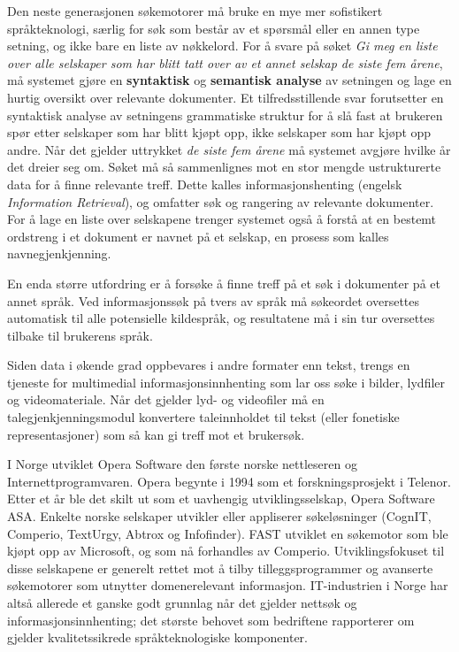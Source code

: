\begin{multicols}{2}

Den neste generasjonen søkemotorer må bruke en mye mer sofistikert språkteknologi, særlig for søk som består av et spørsmål eller en annen type setning, og ikke bare en liste av nøkkelord. For å svare på søket \textit{Gi meg en liste over alle selskaper som har blitt tatt over av et annet selskap de siste fem årene}, må systemet gjøre en \textbf{syntaktisk} og \textbf{semantisk analyse} av setningen og lage en hurtig oversikt over relevante dokumenter. Et tilfredsstillende svar forutsetter en syntaktisk analyse av setningens grammatiske struktur for å slå fast at brukeren spør etter selskaper som har blitt kjøpt opp, ikke selskaper som har kjøpt opp andre. Når det gjelder uttrykket \textit{de siste fem årene} må systemet avgjøre hvilke år det dreier seg om. Søket må så sammenlignes mot en stor mengde ustrukturerte data for å finne relevante treff. Dette kalles informasjonshenting (engelsk \textit{Information Retrieval}), og omfatter søk og rangering av relevante dokumenter. For å lage en liste over selskapene trenger systemet også å forstå at en bestemt ordstreng i et dokument er navnet på et selskap, en prosess som kalles navnegjenkjenning.

En enda større utfordring er å forsøke å finne treff på et søk i dokumenter på et annet språk. Ved informasjonssøk på tvers av språk må søkeordet oversettes automatisk til alle potensielle kildespråk, og resultatene må i sin tur oversettes tilbake til brukerens språk.   

Siden data i økende grad oppbevares i andre formater enn tekst, trengs en tjeneste for multimedial informasjonsinnhenting som lar oss søke i bilder, lydfiler og videomateriale. Når det gjelder lyd- og videofiler må en talegjenkjenningsmodul konvertere taleinnholdet til tekst (eller fonetiske representasjoner) som så kan gi treff mot et brukersøk.

I Norge utviklet Opera Software den første norske nettleseren og Internettprogramvaren. Opera begynte i 1994 som et forskningsprosjekt i Telenor. 
Etter et år ble det skilt ut som et uavhengig utviklingsselskap, Opera Software ASA. Enkelte norske selskaper utvikler eller appliserer søkeløsninger (CognIT, Comperio, TextUrgy, Abtrox og  Infofinder). 
FAST utviklet en søkemotor som ble kjøpt opp av Microsoft, og som nå forhandles av Comperio. 
Utviklingsfokuset til disse selskapene er generelt rettet mot å tilby tilleggsprogrammer og avanserte søkemotorer som utnytter domenerelevant informasjon.
IT-industrien i Norge har altså allerede et ganske godt grunnlag når det gjelder nettsøk og informasjonsinnhenting; det største behovet som bedriftene rapporterer om gjelder kvalitetssikrede språkteknologiske komponenter.


\end{multicols}
